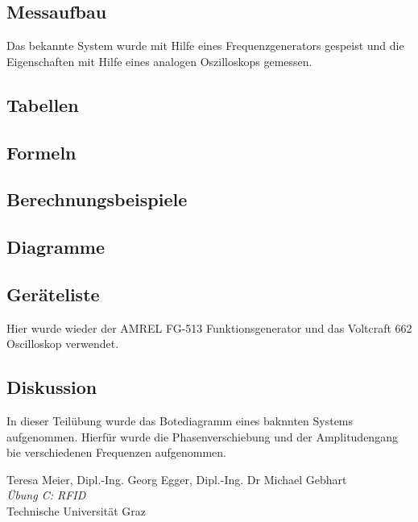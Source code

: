 \documentclass[12pt,a4paper,ngerman]{article}
\begin{document}
\subsection{Messaufbau}
Das bekannte System wurde mit Hilfe eines Frequenzgenerators gespeist und die Eigenschaften mit Hilfe eines analogen Oszilloskops gemessen.

\subsection{Tabellen}

\subsection{Formeln}

\subsection{Berechnungsbeispiele}

\subsection{Diagramme}

\subsection{Geräteliste}
Hier wurde wieder der AMREL FG-513 Funktionsgenerator und das Voltcraft 662 Oscilloskop verwendet.

\subsection{Diskussion}
In dieser Teilübung wurde das Botediagramm eines baknnten Systems aufgenommen. Hierfür wurde die Phasenverschiebung und der Amplitudengang bie verschiedenen Frequenzen aufgenommen. 

\begin{thebibliography}{9}

  Teresa Meier, Dipl.-Ing. Georg Egger, Dipl.-Ing. Dr Michael Gebhart\\
  \emph{Übung C: RFID}\\
  Technische Universität Graz
\end{thebibliography}

 



   
\end{document}
